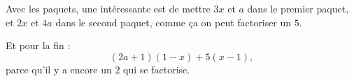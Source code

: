 
Avec les paquets, une intéressante est de mettre \( 3x\) et \( a\) dans le premier paquet, et \( 2x\) et \( 4a\) dans le second paquet, comme ça on peut factoriser un \( 5\).

Et pour la fin :
\begin{equation}
    (2a+1)(1-x)+5(x-1),
\end{equation}
parce qu'il y a encore un \( 2\) qui se factorise.

